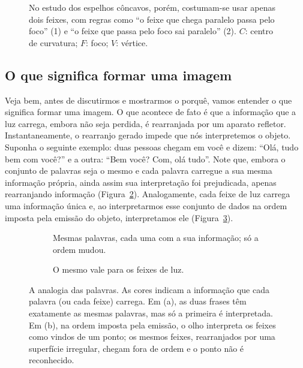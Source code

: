 \documentclass[11pt,a4paper]{article}
\begin{document}
\begin{figure}[!ht]
  \centering
  \begin{minipage}[c]{0.5\textwidth}
    \centering
    
  \end{minipage}\hfill
  \begin{minipage}[c]{0.46\textwidth}
    \captionsetup{margin=0pt}
    \caption{No estudo dos espelhos côncavos, porém, costumam-se usar apenas
      dois feixes, com regras como \enquote{o feixe que chega paralelo passa pelo
      foco} (1) e \enquote{o feixe que passa pelo foco sai paralelo} (2).
      $C$: centro de curvatura; $F$: foco; $V$: vértice.}
    \label{fig:dois-feixes}
  \end{minipage}
\end{figure}

\subsection*{O que significa formar uma imagem}
Veja bem, antes de discutirmos e mostrarmos o porquê,
vamos entender o que significa formar uma imagem. O que acontece de fato é que a
informação que a luz carrega, embora não seja perdida, é rearranjada por um
aparato refletor. Instantaneamente, o rearranjo gerado impede que nós
interpretemos o objeto. Suponha o seguinte exemplo: duas pessoas chegam em você
e dizem: \enquote{Olá, tudo bem com você?} e a outra: \enquote{Bem você? Com,
olá tudo}. Note que, embora o conjunto de palavras seja o mesmo e cada palavra
carregue a sua mesma informação própria, ainda assim sua interpretação foi
prejudicada, apenas rearranjando informação (Figura~\ref{fig:palavras}).
Analogamente, cada feixe de luz carrega uma informação única e, ao
interpretarmos esse conjunto de dados na ordem imposta pela emissão do objeto,
interpretamos ele (Figura~\ref{fig:feixes-ordem}).

\begin{figure}[!ht]
  \centering
  \begin{subfigure}{\textwidth}
    \centering
    
    \caption{Mesmas palavras, cada uma com a sua informação; só a ordem mudou.}
    \label{fig:palavras}
  \end{subfigure}

  \bigskip
  \begin{subfigure}{\textwidth}
    \centering
    
    \caption{O mesmo vale para os feixes de luz.}
    \label{fig:feixes-ordem}
  \end{subfigure}
  \caption{A analogia das palavras. As cores indicam a informação que cada
    palavra (ou cada feixe) carrega. Em (a), as duas frases têm exatamente as
    mesmas palavras, mas só a primeira é interpretada. Em (b), na ordem imposta
    pela emissão, o olho interpreta os feixes como vindos de um ponto; os mesmos
    feixes, rearranjados por uma superfície irregular, chegam fora de ordem e o
    ponto não é reconhecido.}
  \label{fig:analogia}
\end{figure}
\end{document}
